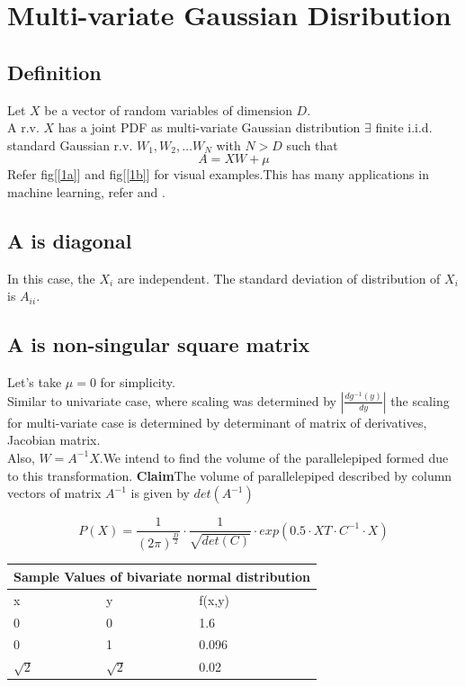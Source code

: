 \documentclass{article}
\begin{document}

\section{Multi-variate Gaussian Disribution}
\subsection{Definition}
Let $X$ be a vector of random variables of dimension $D$.\\
A r.v. $X$ has a joint PDF as multi-variate Gaussian distribution $\exists$ finite i.i.d. standard Gaussian \newpage r.v. $W_1, W_2, \dots W_N$ with $N > D$ such that \[ A = XW + \mu \]
Refer fig[\ref{1a}] and fig[\ref{1b}] for visual examples.This has many applications in machine learning, refer \cite{link2} and \cite{texbook}.

\subsection{A is diagonal}
In this case, the $X_i$ are independent. The standard deviation of distribution of $X_i$ is $A_{ii}$.

\subsection{A is non-singular square matrix}
Let’s take $\mu = 0$ for simplicity.\\
Similar to univariate case, where scaling was determined by $|\frac{dg^{-1}(y)}{dy}|$ the scaling for multi-variate
case is determined by determinant of matrix of derivatives, Jacobian matrix.\\
Also, $W = A^{-1}X$.We intend to find the volume of the parallelepiped formed due to this transformation.
\textbf{Claim}The volume of parallelepiped described by column vectors of matrix $A^{-1}$ is given by $det(A^{-1})$

\begin{equation}
P(X) = \frac{1}{(2\pi)^{\frac{D}{2}}}\cdot\frac{1}{\sqrt{det(C)}}\cdot exp(0.5 \cdot XT \cdot C^{-1} \cdot X)
\end{equation}

\begin{tabular}{ |p{3 cm}|p{3 cm}|p{3 cm}| }
\hline
\multicolumn{3}{|c|}{Sample Values of bivariate normal distribution}\\
\hline
x & y & f(x,y) \\
\hline
0 & 0 & 1.6\\
0 & 1 & 0.096 \\
$\sqrt{2}$ & $\sqrt{2}$ & 0.02 \\
\hline

\end{tabular}




\end{document}
